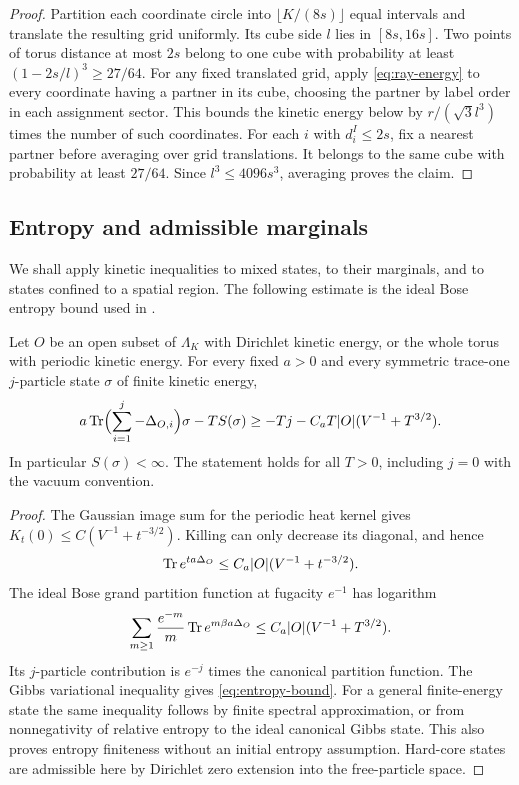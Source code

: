 \begin{proof}
Partition each coordinate circle into $\lfloor K/(8s)\rfloor$ equal
intervals and translate the resulting grid uniformly. Its cube side
$l$ lies in $[8s,16s]$. Two points of torus distance at most $2s$
belong to one cube with probability at least
$(1-2s/l)^3\ge27/64$. For any fixed translated grid, apply
\eqref{eq:ray-energy} to every coordinate having a partner in its
cube, choosing the partner by label order in each assignment sector.
This bounds the kinetic energy below by
$r/(\sqrt3l^3)$ times the number of such coordinates. For each
$i$ with $d_i^I\le2s$, fix a nearest partner before averaging over
grid translations. It belongs to the same cube with probability at
least $27/64$. Since $l^3\le4096s^3$, averaging proves the claim.
\end{proof}

\subsection{Entropy and admissible marginals}

We shall apply kinetic inequalities to mixed states, to their marginals,
and to states confined to a spatial region. The following estimate is the
ideal Bose entropy bound used in \citet[Section~3, ``An entropy bound'']{B}.

\begin{lemma}\label{lem:entropy}
Let $O$ be an open subset of $\Lambda_K$ with Dirichlet kinetic energy,
or the whole torus with periodic kinetic energy. For every fixed $a>0$
and every symmetric trace-one $j$-particle state $\sigma$ of finite
kinetic energy,
\begin{equation}\label{eq:entropy-bound}
 a\operatorname{Tr}\Bigl(\sum_{i=1}^j-\Delta_{O,i}\Bigr)\sigma-TS(\sigma)
 \ge -Tj-C_aT|O|(V^{-1}+T^{3/2}).
\end{equation}
In particular $S(\sigma)<\infty$. The statement holds for all $T>0$,
including $j=0$ with the vacuum convention.
\end{lemma}

\begin{proof}
The Gaussian image sum for the periodic heat kernel gives
$K_t(0)\le C(V^{-1}+t^{-3/2})$. Killing can only decrease its
diagonal, and hence
\[
 \operatorname{Tr} e^{ta\Delta_O}\le C_a|O|(V^{-1}+t^{-3/2}).
\]
The ideal Bose grand partition function at fugacity $e^{-1}$ has
logarithm
\[
 \sum_{m\ge1}\frac{e^{-m}}m\operatorname{Tr} e^{m\beta a\Delta_O}
 \le C_a|O|(V^{-1}+T^{3/2}).
\]
Its $j$-particle contribution is $e^{-j}$ times the canonical
partition function. The Gibbs variational inequality gives
\eqref{eq:entropy-bound}. For a general finite-energy state the same
inequality follows by finite spectral approximation, or from
nonnegativity of relative entropy to the ideal canonical Gibbs state.
This also proves entropy finiteness without an initial entropy
assumption. Hard-core states are admissible here by Dirichlet zero
extension into the free-particle space.
\end{proof}

